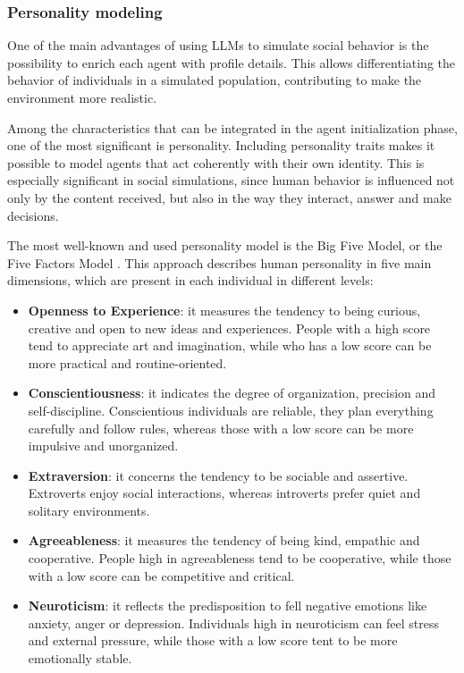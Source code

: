 \subsubsection{Personality modeling}
One of the main advantages of using LLMs to simulate social behavior is the possibility to enrich each agent with profile details.
This allows differentiating the behavior of individuals in a simulated population, contributing to make the environment more realistic.

Among the characteristics that can be integrated in the agent initialization phase, one of the most significant is personality.
Including personality traits makes it possible to model agents that act coherently with their own identity.
This is especially significant in social simulations, since human behavior is influenced not only by the content received, but also in the way they interact, answer and make decisions.

\medskip
The most well-known and used personality model is the Big Five Model, or the Five Factors Model \cite{barrick1991bigfive, McCrae1992}. This approach describes human personality in five main dimensions, which are present in each individual in different levels:

\begin{itemize}
    \item \textbf{Openness to Experience}: it measures the tendency to being curious, creative and open to new ideas and experiences. People with a high score tend to appreciate art and imagination, while who has a low score can be more practical and routine-oriented.
    
    \item \textbf{Conscientiousness}: it indicates the degree of organization, precision and self-discipline. Conscientious individuals are reliable, they plan everything carefully and follow rules, whereas those with a low score can be more impulsive and unorganized.
    
    \item \textbf{Extraversion}: it concerns the tendency to be sociable and assertive. Extroverts enjoy social interactions, whereas introverts prefer quiet and solitary environments. 
    
    \item \textbf{Agreeableness}: it measures the tendency of being kind, empathic and cooperative. People high in agreeableness tend to be cooperative, while those with a low score can be competitive and critical.
    
    \item \textbf{Neuroticism}: it reflects the predisposition to fell negative emotions like anxiety, anger or depression. Individuals high in neuroticism can feel stress and external pressure, while those with a low score tent to be more emotionally stable. 
\end{itemize}


